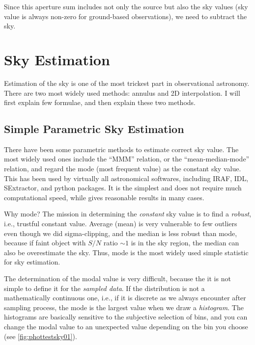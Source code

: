 Since this aperture sum includes not only the source but also the sky values (sky value is always non-zero for ground-based observations), we need to subtract the sky.


\section{Sky Estimation}
Estimation of the sky is one of the most trickest part in observational astronomy. There are two most widely used methods: annulus and 2D interpolation. I will first explain few formulae, and then explain these two methods.

\subsection{Simple Parametric Sky Estimation}
There have been some parametric methods to estimate correct sky value. The most widely used ones include the ``MMM'' relation, or the ``mean-median-mode'' relation, and regard the mode (most frequent value) as the constant sky value. This has been used by virtually all astronomical softwares, including IRAF, IDL, SExtractor, and python packages. It is the simplest and does not require much computational speed, while gives reasonable results in many cases.

Why mode? The mission in determining the \textit{constant} sky value is to find a \textit{robust}, i.e., trustful constant value. Average (mean) is very vulnerable to few outliers even though we did sigma-clipping, and the median is less robust than mode, because if faint object with $ S/N $ ratio $ \sim 1 $ is in the sky region, the median can also be overestimate the sky. Thus, mode is the most widely used simple statistic for sky estimation.

The determination of the modal value is very difficult, because the it is not simple to define it for the \textit{sampled data}. If the distribution is not a mathematically continuous one, i.e., if it is discrete as we always encounter after sampling process, the mode is the largest value when we draw a \textit{histogram}. The histograms are basically sensitive to the subjective selection of bins, and you can change the modal value to an unexpected value depending on the bin you choose (see \cref{fig:phottestsky01}). %

